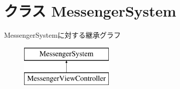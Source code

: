 \hypertarget{interface_messenger_system}{
\section{クラス MessengerSystem}
\label{dc/dc9/interface_messenger_system}
}
MessengerSystemに対する継承グラフ\begin{figure}[H]
\begin{center}
\leavevmode
\includegraphics[height=2.000000cm]{dc/dc9/interface_messenger_system}
\end{center}
\end{figure}
